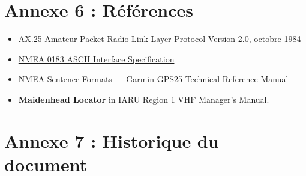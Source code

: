 \clearpage
\section*{Annexe 6 : Références}\label{annexe-6-ruxe9fuxe9rences}

{\small
\begin{itemize}
\setlength{\itemsep}{0pt}
\setlength{\parsep}{0pt}
\setlength{\topsep}{2pt}
\tightlist
\item
  \href{http://www.tapr.org/tapr/html/ax25.html}{AX.25 Amateur
  Packet-Radio Link-Layer Protocol Version 2.0, octobre 1984}
\item
  \href{http://www.nmea.org/0183.htm}{NMEA 0183 ASCII Interface
  Specification}
\item
  \href{http://www.garmin.com/manuals/spec25.pdf}{NMEA Sentence Formats
  --- Garmin GPS25 Technical Reference Manual}
\item
  \textbf{Maidenhead Locator} in IARU Region 1 VHF Manager's Manual.
\end{itemize}
}

\clearpage
\section*{Annexe 7 : Historique du document}\label{annexe-7-historique-du-document}

